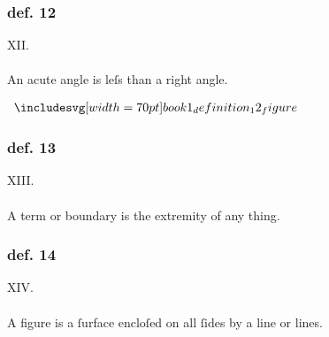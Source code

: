 \hfill

\begin{minipage}{0.67\textwidth}
    \subsubsection{def. 12}
    \begin{center}
        XII.\label{book1def12}\\
        \hfill\\
        An acute angle is leſs than a right angle.
    \end{center}
\end{minipage}%
\begin{minipage}{0.33\textwidth}
    \begin{center}
        $\img[0][0][70]{book1_definition_12_figure}$
    \end{center}
\end{minipage}

\hfill

\begin{minipage}{0.33\textwidth}
    \phantom{}
\end{minipage}%
\begin{minipage}{0.67\textwidth}
    \subsubsection{def. 13}
    \begin{center}
        XIII.\label{book1def13}\\
        \hfill\\
        A term or boundary is the extremity of any thing.
    \end{center}
    \subsubsection{def. 14}
    \begin{center}
        XIV.\label{book1def14}\\
        \hfill\\
        A figure is a ſurface encloſed on all ſides by a line or lines.
    \end{center}
\end{minipage}

\hfill

